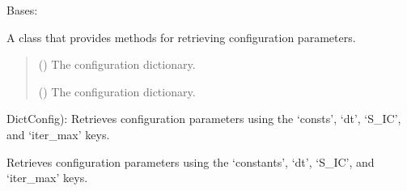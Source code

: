 \documentclass[a4paper,11pt,english,openany]{sphinxmanual}
\begin{document}

\begin{fulllineitems}
\label{\detokenize{api/spyice.utils.config_sort:src.spyice.utils.config_sort.ConfigSort}}
\pysigstartsignatures
\pysigline
{}
\pysigstopsignatures
\sphinxAtStartPar
Bases: 

\sphinxAtStartPar
A class that provides methods for retrieving configuration parameters.
\begin{quote}\begin{description}
\sphinxAtStartPar
{} () \textendash{} The configuration dictionary.

\sphinxAtStartPar
{} () \textendash{} The configuration dictionary.

\end{description}\end{quote}


\begin{fulllineitems}

\pysigstartsignatures
\pysigline
{}
\pysigstopsignatures
\sphinxAtStartPar
DictConfig): Retrieves configuration parameters using the ‘consts’, ‘dt’, ‘S\_IC’, and ‘iter\_max’ keys.

\end{fulllineitems}


\begin{fulllineitems}
\label{\detokenize{api/spyice.utils.config_sort:src.spyice.utils.config_sort.ConfigSort.get_ownconfig_params}}
\pysigstartsignatures
\pysiglinewithargsret
{}
{}
{}
\pysigstopsignatures
\sphinxAtStartPar
Retrieves configuration parameters using the ‘constants’, ‘dt’, ‘S\_IC’, and ‘iter\_max’ keys.


\end{fulllineitems}
\end{fulllineitems}
\end{document}
